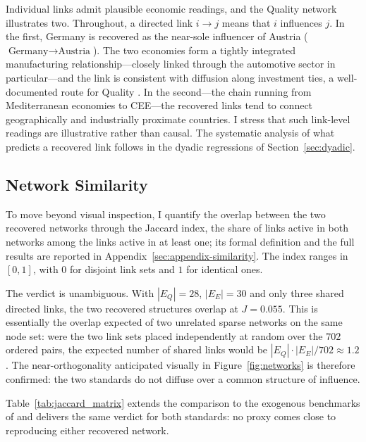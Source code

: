 \documentclass[12pt,a4paper]{article}
\begin{document}
Individual links admit plausible economic readings, and the Quality network illustrates two. Throughout, a directed link $i \rightarrow j$ means that $i$ influences $j$. In the first, Germany is recovered as the near-sole influencer of Austria ($\text{Germany} \rightarrow \text{Austria}$). The two economies form a tightly integrated manufacturing relationship---closely linked through the automotive sector in particular---and the link is consistent with diffusion along investment ties, a well-documented route for Quality \citep{corbett2006, arimura2011}. In the second---the chain running from Mediterranean economies to CEE---the recovered links tend to connect geographically and industrially proximate countries. I stress that such link-level readings are illustrative rather than causal. The systematic analysis of what predicts a recovered link follows in the dyadic regressions of Section~\ref{sec:dyadic}.

\subsection{Network Similarity}
\label{sec:network-similarity}


To move beyond visual inspection, I quantify the overlap between the two recovered networks through the Jaccard index, the share of links active in both networks among the links active in at least one; its formal definition and the full results are reported in Appendix~\ref{sec:appendix-similarity}. The index ranges in $[0,1]$, with $0$ for disjoint link sets and $1$ for identical ones.

The verdict is unambiguous. With $|E_Q| = 28$, $|E_E| = 30$ and only three shared directed links, the two recovered structures overlap at $J = 0.055$. This is essentially the overlap expected of two unrelated sparse networks on the same node set: were the two link sets placed independently at random over the $702$ ordered pairs, the expected number of shared links would be $|E_Q| \cdot |E_E| / 702 \approx 1.2$. The near-orthogonality anticipated visually in Figure~\ref{fig:networks} is therefore confirmed: the two standards do not diffuse over a common structure of influence.

Table~\ref{tab:jaccard_matrix} extends the comparison to the exogenous benchmarks of \citet{albuquerque2007} and delivers the same verdict for both standards: no proxy comes close to reproducing either recovered network.
\end{document}
